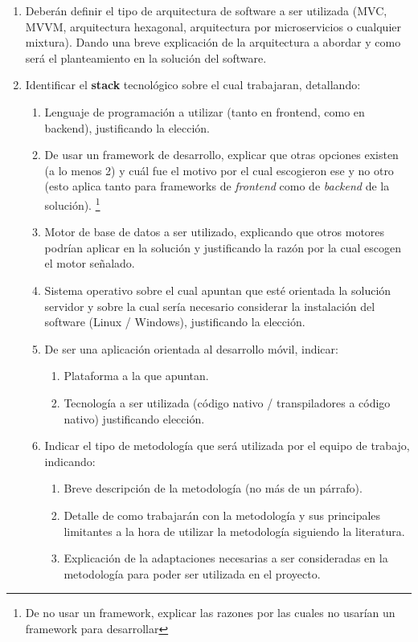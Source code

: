 \documentclass[]{article}
\begin{document}
\begin{enumerate}
    \item Deberán definir el tipo de arquitectura de software a ser utilizada (MVC, MVVM, arquitectura hexagonal, arquitectura por microservicios o cualquier mixtura). Dando una breve explicación de la arquitectura a abordar
    y como será el planteamiento en la solución del software.
    \item Identificar el \textbf{stack} tecnológico sobre el cual trabajaran, detallando:
    \begin{enumerate}
        \item Lenguaje de programación a utilizar (tanto en frontend, como en backend), justificando la elección.
        \item De usar un framework de desarrollo, explicar que otras opciones existen (a lo menos 2) y cuál fue el motivo por el cual escogieron ese y no otro (esto aplica tanto para frameworks de \textit{frontend} como de \textit{backend} de la solución).
        \footnote{De no usar un framework, explicar las razones por las cuales no usarían un framework para desarrollar}
        \item Motor de base de datos a ser utilizado, explicando que otros motores podrían aplicar en la solución y justificando la razón por la cual escogen el motor señalado.
        \item Sistema operativo sobre el cual apuntan que esté orientada la solución servidor y sobre la cual sería necesario considerar la instalación del software (Linux / Windows), justificando la elección.
        \item De ser una aplicación orientada al desarrollo móvil, indicar:
        \begin{enumerate}
            \item Plataforma a la que apuntan.
            \item Tecnología a ser utilizada (código nativo / transpiladores a código nativo) justificando elección.
        \end{enumerate}
        \item Indicar el tipo de metodología que será utilizada por el equipo de trabajo, indicando:
        \begin{enumerate}
            \item Breve descripción de la metodología (no más de un párrafo).
            \item Detalle de como trabajarán con la metodología y sus principales limitantes a la hora de utilizar la metodología siguiendo la literatura.
            \item Explicación de la adaptaciones necesarias a ser consideradas en la metodología para poder ser utilizada en el proyecto.
        \end{enumerate}
    \end{enumerate}
\end{enumerate}
\end{document}
